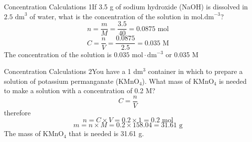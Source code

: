 \vspace{-.5cm}

\begin{wex}{Concentration Calculations 1}{If 3.5 g of sodium hydroxide (NaOH) is dissolved in $2.5 \text{ dm}^{3}$ of water, what is the concentration of the solution in mol.$\text{dm}^{-3}$?}
{
\begin{equation*}
n = \frac{m}{M} = \frac{3.5}{40} = 0.0875 \text{ mol}
\end{equation*}
\begin{equation*}
C = \frac{n}{V} = \frac{0.0875}{2.5} = 0.035 \text{ M}
\end{equation*}
The concentration of the solution is $0.035 \text{ mol} \cdot \text{dm}^{-3}$ or 0.035 M
}
\end{wex}

\begin{wex}{Concentration Calculations 2}{You have a 1 dm$^{3}$ container in which to prepare a solution of potassium permanganate (KMnO$_{4}$). What mass of KMnO$_{4}$ is needed to make a solution with a concentration of 0.2 M?}{
\begin{equation*}
C = \frac{n}{V}
\end{equation*}
therefore
\begin{equation*}
n = C \times V = 0.2 \times 1 = 0.2 \text{ mol}
\end{equation*}
\begin{equation*}
m = n \times M = 0.2 \times 158.04 = 31.61 \text{ g}
\end{equation*}
The mass of KMnO$_{4}$ that is needed is 31.61 g.
}
\end{wex}

